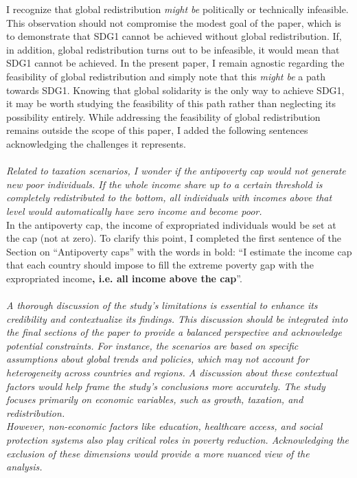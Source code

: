 \documentclass[12pt,english]{article}
\begin{document}
I recognize that global redistribution \textit{might be} politically or technically infeasible. This observation should not compromise the modest goal of the paper, which is to demonstrate that SDG1 cannot be achieved without global redistribution. If, in addition, global redistribution turns out to be infeasible, it would mean that SDG1 cannot be achieved. In the present paper, I remain agnostic regarding the feasibility of global redistribution and simply note that this \textit{might be} a path towards SDG1. Knowing that global solidarity is the only way to achieve SDG1, it may be worth studying the feasibility of this path rather than neglecting its possibility entirely. 
While addressing the feasibility of global redistribution remains outside the scope of this paper, I added the following sentences acknowledging the challenges it represents. %
~\\ ~\\

\textit{Related to taxation scenarios, I wonder if the antipoverty cap would not generate new poor individuals. If the whole income share up to a certain threshold is completely redistributed to the bottom, all individuals with incomes above that level would automatically have zero income and become poor. }~\\

In the antipoverty cap, the income of expropriated individuals would be set at the cap (not at zero). To clarify this point, I completed the first sentence of the Section on ``Antipoverty caps'' with the words in bold: ``I estimate the income cap that each country should impose to fill the extreme poverty gap with the expropriated income\textbf{, i.e. all income above the cap}''.
~\\ ~\\

\textit{A thorough discussion of the study's limitations is essential to enhance its credibility and contextualize its findings. This discussion should be integrated into the final sections of the paper to provide a balanced perspective and acknowledge potential constraints. For instance, the scenarios are based on specific assumptions about global trends and policies, which may not account for heterogeneity across countries and regions. A discussion about these contextual factors would help frame the study's conclusions more accurately. The study focuses primarily on economic variables, such as growth, taxation, and redistribution. }~\\
\textit{However, non-economic factors like education, healthcare access, and social protection systems also play critical roles in poverty reduction. Acknowledging the exclusion of these dimensions would provide a more nuanced view of the analysis.}~\\
\end{document}
